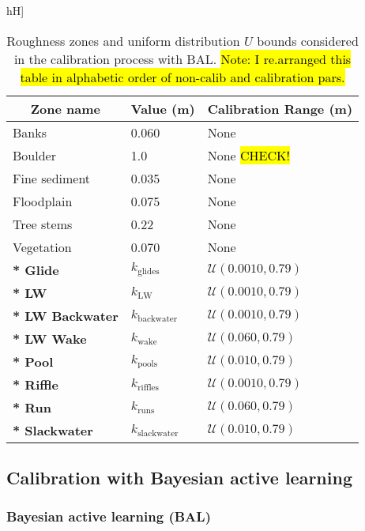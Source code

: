 \documentclass[draft,linenumbers,onecolumn]{agujournal2019} %
\begin{document}
\begin{table}hH]
	\centering
	\caption{Roughness zones and uniform distribution $U$ bounds considered in the calibration process with BAL. \hl{Note: I re.arranged this table in alphabetic order of non-calib and calibration pars.}}
	\begin{tabular}{p{5.5cm} p{3cm} p{5.5cm}}
		\hline
		\multicolumn{1}{c}{\textbf{Zone name}} & 
		\multicolumn{1}{c}{\textbf{Value (m)}} & 
		\multicolumn{1}{c}{\textbf{Calibration Range (m)}} \\ \hline
		Banks                    & 0.060   & None \\
		Boulder        & 1.0 &  None \hl{CHECK!} \\
		Fine sediment            & 0.035   & None\\
		Floodplain              & 0.075   & None \\
		Tree stems                & 0.22  & None \\
		Vegetation                & 0.070   & None \\ \hline
		\textbf{* Glide}          &$k_{\text{glides}}$  & $\mathcal{U}(0.0010, 0.79)$ \\
		\textbf{* LW}  & $k_{\text{LW}}$ &  $\mathcal{U}(0.0010, 0.79)$ \\ \hline
		\textbf{* LW Backwater}       & $k_{\text{backwater}}$  &  $\mathcal{U}(0.0010, 0.79)$ \\
		\textbf{* LW Wake}            & $k_{\text{wake}}$  & $\mathcal{U}(0.060, 0.79)$ \\
		\textbf{* Pool}           & $k_{\text{pools}} $   & $\mathcal{U}(0.010, 0.79)$ \\
		\textbf{* Riffle}          & $k_{\text{riffles}}$ &  $\mathcal{U}(0.0010, 0.79)$ \\
		\textbf{* Run}             & $k_{\text{runs}}$  & $\mathcal{U}(0.060, 0.79)$ \\
		\textbf{* Slackwater}      &  $k_{\text{slackwater}}$   & $\mathcal{U}(0.010, 0.79)$ \\
	\end{tabular}
	\label{tab:roughness-zones}
\end{table}


\subsection{Calibration with Bayesian active learning}
\label{sec:bal}

\subsubsection{Bayesian active learning (BAL)}
\label{sec:bal-inference}
\end{document}
